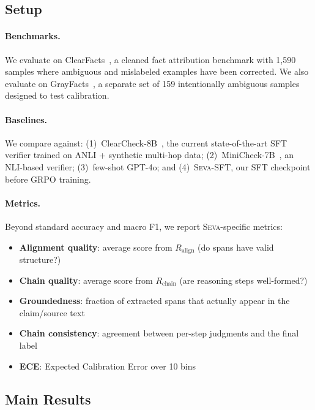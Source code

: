 \documentclass{article}
\newcommand{\seva}{\textsc{Seva}}
\begin{document}
\subsection{Setup}

\paragraph{Benchmarks.}
We evaluate on ClearFacts~\citep{seo2025vtv}, a cleaned fact attribution benchmark with 1,590 samples where ambiguous and mislabeled examples have been corrected.
We also evaluate on GrayFacts~\citep{seo2025vtv}, a separate set of 159 intentionally ambiguous samples designed to test calibration.

\paragraph{Baselines.}
We compare against: (1)~ClearCheck-8B~\citep{seo2025vtv}, the current state-of-the-art SFT verifier trained on ANLI + synthetic multi-hop data; (2)~MiniCheck-7B~\citep{tang2024minicheck}, an NLI-based verifier; (3)~few-shot GPT-4o; and (4)~\seva{}-SFT, our SFT checkpoint before GRPO training.

\paragraph{Metrics.}
Beyond standard accuracy and macro F1, we report \seva{}-specific metrics:
\begin{itemize}[nosep,leftmargin=*]
  \item \textbf{Alignment quality}: average score from $R_{\text{align}}$ (do spans have valid structure?)
  \item \textbf{Chain quality}: average score from $R_{\text{chain}}$ (are reasoning steps well-formed?)
  \item \textbf{Groundedness}: fraction of extracted spans that actually appear in the claim/source text
  \item \textbf{Chain consistency}: agreement between per-step judgments and the final label
  \item \textbf{ECE}: Expected Calibration Error over 10 bins
\end{itemize}


\subsection{Main Results}
\end{document}
